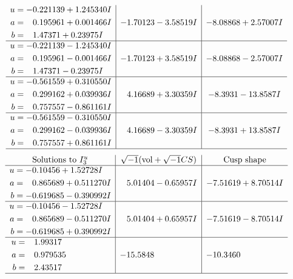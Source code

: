 \documentclass[1p]{elsarticle_modified}
\theoremstyle{definition}
\newcommand{\I}{\sqrt{-1}}
\begin{document}
$$\begin{array}{c|c|c}
\begin{aligned}
u &= -0.221139 + 1.245340 I \\
a &= \phantom{-}0.195961 + 0.001466 I \\
b &= \phantom{-}1.47371 + 0.23975 I\end{aligned}
 & -1.70123 - 3.58519 I & -8.08868 + 2.57007 I \\ \hline\begin{aligned}
u &= -0.221139 - 1.245340 I \\
a &= \phantom{-}0.195961 - 0.001466 I \\
b &= \phantom{-}1.47371 - 0.23975 I\end{aligned}
 & -1.70123 + 3.58519 I & -8.08868 - 2.57007 I \\ \hline\begin{aligned}
u &= -0.561559 + 0.310550 I \\
a &= \phantom{-}0.299162 + 0.039936 I \\
b &= \phantom{-}0.757557 - 0.861161 I\end{aligned}
 & \phantom{-}4.16689 + 3.30359 I & -8.3931 - 13.8587 I \\ \hline\begin{aligned}
u &= -0.561559 - 0.310550 I \\
a &= \phantom{-}0.299162 - 0.039936 I \\
b &= \phantom{-}0.757557 + 0.861161 I\end{aligned}
 & \phantom{-}4.16689 - 3.30359 I & -8.3931 + 13.8587 I\\
 \hline 
 \end{array}$$\newpage$$\begin{array}{c|c|c}  
\text{Solutions to }I^u_{3}& \I (\text{vol} + \sqrt{-1}CS) & \text{Cusp shape}\\
 \hline 
\begin{aligned}
u &= -0.10456 + 1.52728 I \\
a &= \phantom{-}0.865689 + 0.511270 I \\
b &= -0.619685 - 0.390992 I\end{aligned}
 & \phantom{-}5.01404 - 0.65957 I & -7.51619 + 8.70514 I \\ \hline\begin{aligned}
u &= -0.10456 - 1.52728 I \\
a &= \phantom{-}0.865689 - 0.511270 I \\
b &= -0.619685 + 0.390992 I\end{aligned}
 & \phantom{-}5.01404 + 0.65957 I & -7.51619 - 8.70514 I \\ \hline\begin{aligned}
u &= \phantom{-}1.99317\phantom{ +0.000000I} \\
a &= \phantom{-}0.979535\phantom{ +0.000000I} \\
b &= \phantom{-}2.43517\phantom{ +0.000000I}\end{aligned}
 & -15.5848\phantom{ +0.000000I} & -10.3460\phantom{ +0.000000I}\\
 \hline 
 \end{array}$$\newpage\newpage\renewcommand{\arraystretch}{1}
\end{document}
